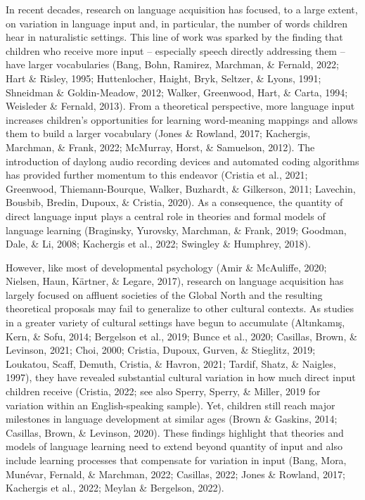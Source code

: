 \documentclass[
  man,floatsintext]{apa6}
\begin{document}
In recent decades, research on language acquisition has focused, to a large extent, on variation in language input and, in particular, the number of words children hear in naturalistic settings. This line of work was sparked by the finding that children who receive more input -- especially speech directly addressing them -- have larger vocabularies (Bang, Bohn, Ramirez, Marchman, \& Fernald, 2022; Hart \& Risley, 1995; Huttenlocher, Haight, Bryk, Seltzer, \& Lyons, 1991; Shneidman \& Goldin-Meadow, 2012; Walker, Greenwood, Hart, \& Carta, 1994; Weisleder \& Fernald, 2013). From a theoretical perspective, more language input increases children's opportunities for learning word-meaning mappings and allows them to build a larger vocabulary (Jones \& Rowland, 2017; Kachergis, Marchman, \& Frank, 2022; McMurray, Horst, \& Samuelson, 2012). The introduction of daylong audio recording devices and automated coding algorithms has provided further momentum to this endeavor (Cristia et al., 2021; Greenwood, Thiemann-Bourque, Walker, Buzhardt, \& Gilkerson, 2011; Lavechin, Bousbib, Bredin, Dupoux, \& Cristia, 2020). As a consequence, the quantity of direct language input plays a central role in theories and formal models of language learning (Braginsky, Yurovsky, Marchman, \& Frank, 2019; Goodman, Dale, \& Li, 2008; Kachergis et al., 2022; Swingley \& Humphrey, 2018).

However, like most of developmental psychology (Amir \& McAuliffe, 2020; Nielsen, Haun, Kärtner, \& Legare, 2017), research on language acquisition has largely focused on affluent societies of the Global North and the resulting theoretical proposals may fail to generalize to other cultural contexts. As studies in a greater variety of cultural settings have begun to accumulate (Altınkamış, Kern, \& Sofu, 2014; Bergelson et al., 2019; Bunce et al., 2020; Casillas, Brown, \& Levinson, 2021; Choi, 2000; Cristia, Dupoux, Gurven, \& Stieglitz, 2019; Loukatou, Scaff, Demuth, Cristia, \& Havron, 2021; Tardif, Shatz, \& Naigles, 1997), they have revealed substantial cultural variation in how much direct input children receive (Cristia, 2022; see also Sperry, Sperry, \& Miller, 2019 for variation within an English-speaking sample). Yet, children still reach major milestones in language development at similar ages (Brown \& Gaskins, 2014; Casillas, Brown, \& Levinson, 2020). These findings highlight that theories and models of language learning need to extend beyond quantity of input and also include learning processes that compensate for variation in input (Bang, Mora, Munévar, Fernald, \& Marchman, 2022; Casillas, 2022; Jones \& Rowland, 2017; Kachergis et al., 2022; Meylan \& Bergelson, 2022).
\end{document}
